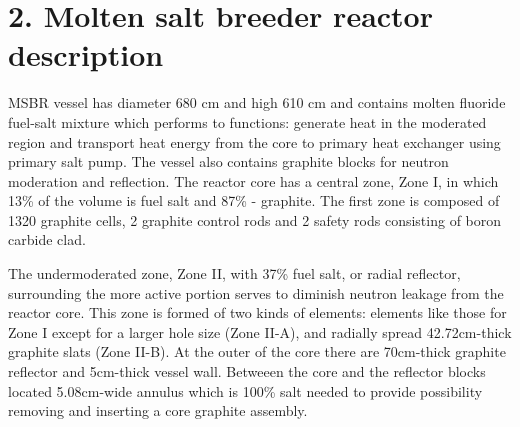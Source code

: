 \documentclass{anstrans}
\begin{document}
\section{2. Molten salt breeder reactor description}
MSBR vessel has diameter 680 cm and high 610 cm and contains molten fluoride fuel-salt mixture which performs to functions: generate heat in the moderated region and transport heat energy from the core to primary heat exchanger using primary salt pump. The vessel also contains graphite blocks for neutron moderation and reflection. The reactor core has a central zone, Zone I, in which 13\% of the volume is fuel salt and 87\% - graphite. The first zone is composed of 1320 graphite cells, 2 graphite control rods and 2 safety rods consisting of boron carbide clad. 

The undermoderated zone, Zone II, with 37\% fuel salt, or radial reflector, surrounding the more active portion serves to diminish neutron leakage from the reactor core. This zone is formed of two kinds of elements: elements like those for Zone I except for a larger hole size (Zone II-A), and radially spread 42.72cm-thick graphite slats (Zone II-B). At the outer of the core there are 70cm-thick graphite reflector and 5cm-thick vessel wall. Betweeen the core and the reflector blocks located 5.08cm-wide annulus which is 100\% salt needed to provide possibility removing and inserting a core graphite assembly. 
\end{document}
